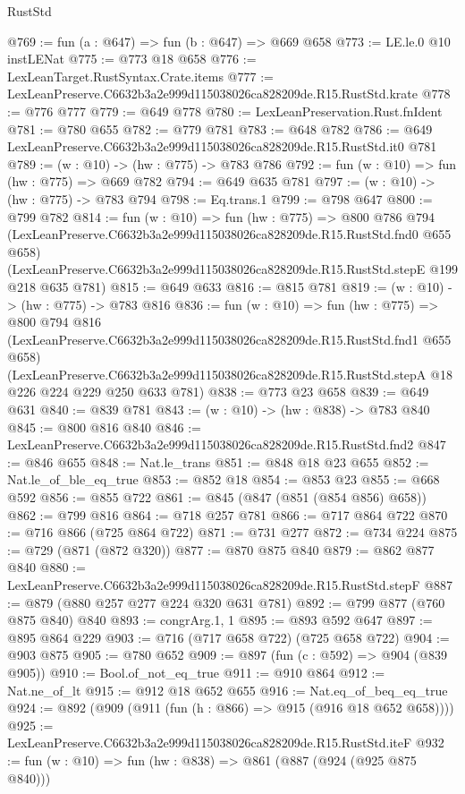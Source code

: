 \begin{lexlean}{RustStd}
\begin{coremodule}
@769 := fun (a : @647) => fun (b : @647) => @669 @658
@773 := LE.le.{0} @10 instLENat
@775 := @773 @18 @658
@776 := LexLeanTarget.RustSyntax.Crate.items
@777 := LexLeanPreserve.C6632b3a2e999d115038026ca828209de.R15.RustStd.krate
@778 := @776 @777
@779 := @649 @778
@780 := LexLeanPreservation.Rust.fnIdent
@781 := @780 @655
@782 := @779 @781
@783 := @648 @782
@786 := @649 LexLeanPreserve.C6632b3a2e999d115038026ca828209de.R15.RustStd.it0 @781
@789 := (w : @10) -> (hw : @775) -> @783 @786
@792 := fun (w : @10) => fun (hw : @775) => @669 @782
@794 := @649 @635 @781
@797 := (w : @10) -> (hw : @775) -> @783 @794
@798 := Eq.trans.{1}
@799 := @798 @647
@800 := @799 @782
@814 := fun (w : @10) =>
  fun (hw : @775) =>
  @800
    @786
    @794
    (LexLeanPreserve.C6632b3a2e999d115038026ca828209de.R15.RustStd.fnd0 @655 @658)
    (LexLeanPreserve.C6632b3a2e999d115038026ca828209de.R15.RustStd.stepE @199 @218 @635 @781)
@815 := @649 @633
@816 := @815 @781
@819 := (w : @10) -> (hw : @775) -> @783 @816
@836 := fun (w : @10) =>
  fun (hw : @775) =>
  @800
    @794
    @816
    (LexLeanPreserve.C6632b3a2e999d115038026ca828209de.R15.RustStd.fnd1 @655 @658)
    (LexLeanPreserve.C6632b3a2e999d115038026ca828209de.R15.RustStd.stepA
      @18
      @226
      @224
      @229
      @250
      @633
      @781)
@838 := @773 @23 @658
@839 := @649 @631
@840 := @839 @781
@843 := (w : @10) -> (hw : @838) -> @783 @840
@845 := @800 @816 @840
@846 := LexLeanPreserve.C6632b3a2e999d115038026ca828209de.R15.RustStd.fnd2
@847 := @846 @655
@848 := Nat.le_trans
@851 := @848 @18 @23 @655
@852 := Nat.le_of_ble_eq_true
@853 := @852 @18
@854 := @853 @23
@855 := @668 @592
@856 := @855 @722
@861 := @845 (@847 (@851 (@854 @856) @658))
@862 := @799 @816
@864 := @718 @257 @781
@866 := @717 @864 @722
@870 := @716 @866 (@725 @864 @722)
@871 := @731 @277
@872 := @734 @224
@875 := @729 (@871 (@872 @320))
@877 := @870 @875 @840
@879 := @862 @877 @840
@880 := LexLeanPreserve.C6632b3a2e999d115038026ca828209de.R15.RustStd.stepF
@887 := @879 (@880 @257 @277 @224 @320 @631 @781)
@892 := @799 @877 (@760 @875 @840) @840
@893 := congrArg.{1, 1}
@895 := @893 @592 @647
@897 := @895 @864 @229
@903 := @716 (@717 @658 @722) (@725 @658 @722)
@904 := @903 @875
@905 := @780 @652
@909 := @897 (fun (c : @592) => @904 (@839 @905))
@910 := Bool.of_not_eq_true
@911 := @910 @864
@912 := Nat.ne_of_lt
@915 := @912 @18 @652 @655
@916 := Nat.eq_of_beq_eq_true
@924 := @892 (@909 (@911 (fun (h : @866) => @915 (@916 @18 @652 @658))))
@925 := LexLeanPreserve.C6632b3a2e999d115038026ca828209de.R15.RustStd.iteF
@932 := fun (w : @10) => fun (hw : @838) => @861 (@887 (@924 (@925 @875 @840)))

\end{coremodule}
\end{lexlean}
